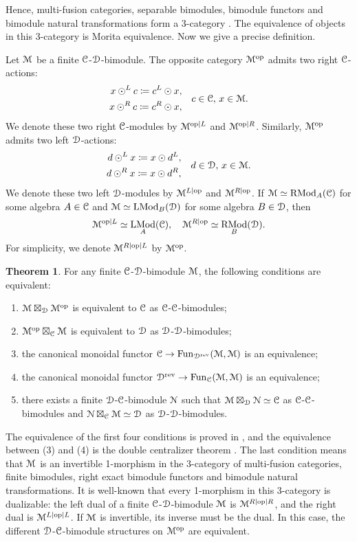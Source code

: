 \documentclass[10pt]{article}
\theoremstyle{definition}
\newtheorem{thm}{Theorem}[section]
\numberwithin{equation}{section}
\numberwithin{thm}{section}
\newcommand{\bnu}{\begin{enumerate}}
\newcommand{\enu}{\end{enumerate}}
\newcommand{\CC}{\EuScript{C}}
\newcommand{\CD}{\EuScript{D}}
\newcommand{\CM}{\EuScript{M}}
\newcommand{\CN}{\EuScript{N}}
\DeclareMathOperator{\fun}{Fun}
\DeclareMathOperator{\LMod}{LMod}
\DeclareMathOperator{\RMod}{RMod}
\newcommand{\op}{\mathrm{op}}
\newcommand{\rev}{\mathrm{rev}}
\newcommand{\sep}{\mathrm{sep}}
\begin{document}
Hence, multi-fusion categories, separable bimodules, bimodule functors and bimodule natural transformations form a 3-category%
. The equivalence of objects in this 3-category is Morita equivalence. Now we give a precise definition.

Let $\CM$ be a finite $\CC$-$\CD$-bimodule. The opposite category $\CM^\op$ admits two right $\CC$-actions:
\[
\begin{aligned}
x \odot^L c \coloneqq c^L \odot x , \\
x \odot^R c \coloneqq c^R \odot x ,
\end{aligned} \quad c \in \CC , \, x \in \CM .
\]
We denote these two right $\CC$-modules by $\CM^{\op|L}$ and $\CM^{\op|R}$. Similarly, $\CM^\op$ admits two left $\CD$-actions:
\[
\begin{aligned}
d \odot^L x \coloneqq x \odot d^L , \\
d \odot^R x \coloneqq x \odot d^R ,
\end{aligned} \quad d \in \CD , \, x \in \CM .
\]
We denote these two left $\CD$-modules by $\CM^{L|\op}$ and $\CM^{R|\op}$. If $\CM \simeq \RMod_A(\CC)$ for some algebra $A \in \CC$ and $\CM \simeq \LMod_B(\CD)$ for some algebra $B \in \CD$, then
\[
\CM^{\op|L} \simeq \LMod_A(\CC) , \quad \CM^{R|\op} \simeq \RMod_B(\CD) .
\]
For simplicity, we denote $\CM^{R|\op|L}$ by $\CM^\op$.

\begin{thm} \label{thm_invertible_bimodule}
For any finite $\CC$-$\CD$-bimodule $\CM$, the following conditions are equivalent:
\bnu[(1)]
\item $\CM \boxtimes_\CD \CM^\op$ is equivalent to $\CC$ as $\CC$-$\CC$-bimodules;
\item $\CM^\op \boxtimes_\CC \CM$ is equivalent to $\CD$ as $\CD$-$\CD$-bimodules;
\item the canonical monoidal functor $\CC \to \fun_{\CD^\rev}(\CM,\CM)$ is an equivalence;
\item the canonical monoidal functor $\CD^\rev \to \fun_\CC(\CM,\CM)$ is an equivalence;
\item there exists a finite $\CD$-$\CC$-bimodule $\CN$ such that $\CM \boxtimes_\CD \CN \simeq \CC$ as $\CC$-$\CC$-bimodules and $\CN \boxtimes_\CC \CM \simeq \CD$ as $\CD$-$\CD$-bimodules.
\enu
\end{thm}

The equivalence of the first four conditions is proved in \cite[Proposition 4.2]{ENO10}, and the equivalence between (3) and (4) is the double centralizer theorem \cite[Theorem 3.27]{EO04}. The last condition means that $\CM$ is an invertible 1-morphism in the 3-category of multi-fusion categories, finite bimodules, right exact bimodule functors and bimodule natural transformations. It is well-known that every 1-morphism in this 3-category is dualizable: the left dual of a finite $\CC$-$\CD$-bimodule $\CM$ is $\CM^{R|\op|R}$, and the right dual is $\CM^{L|\op|L}$. If $\CM$ is invertible, its inverse must be the dual. In this case, the different $\CD$-$\CC$-bimodule structures on $\CM^\op$ are equivalent.
\end{document}

